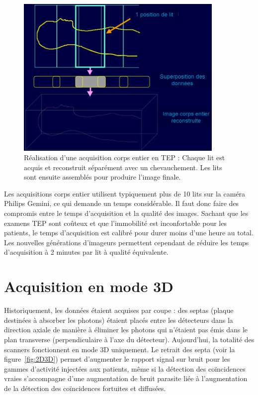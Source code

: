 \begin{figure}
\centering
\includegraphics[width=10cm]{images/multilits}
\caption[Acquisitions corps entier en TEP]{Réalisation d'une acquisition corps entier en TEP : Chaque lit est acquis et reconstruit séparément avec un chevauchement. Les lits sont ensuite assemblés pour produire l'image finale.}
\label{fig:multilits}
\end{figure}

Les acquisitions corps entier utilisent typiquement plus de 10 lits sur la caméra Philips Gemini, ce qui demande un temps considérable. Il faut donc faire des compromis entre le temps d'acquisition et la qualité des images. Sachant que les examens TEP sont coûteux et que l'immobilité est inconfortable pour les patients, le temps d'acquisition est calibré pour durer moins d'une heure au total. Les nouvelles générations d'imageurs permettent cependant de réduire les temps d'acquisition à 2 minutes par lit à qualité équivalente.


	\section{Acquisition en mode 3D}

Historiquement, les données étaient acquises par coupe : des septas (plaque destinées à absorber les photons) étaient placés entre les détecteurs dans la direction axiale de manière à éliminer les photons qui n'étaient pas émis dans le plan  transverse (perpendiculaire à l'axe du détecteur). Aujourd'hui, la totalité des scanners fonctionnent en mode 3D uniquement. Le retrait des septa (voir la figure~\ref{fig:2D3D}) permet d'augmenter le rapport signal sur bruit pour les gammes d'activité injectées aux patients, même si la détection des coïncidences vraies s'accompagne d'une augmentation de bruit parasite liée à l'augmentation de la détection des coïncidences fortuites et diffusées.

